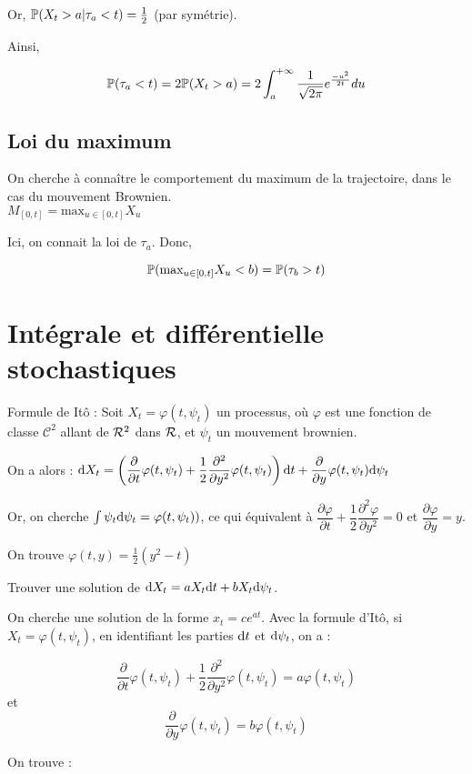 Or, $\P(X_t > a \vert \tau_a < t) = \frac{1}{2}$ (par symétrie).

Ainsi,

\[ \P(\tau_a < t) = 2\P(X_t > a) = 2 \int_a^{+\infty} \frac{1}{\sqrt{2\pi}} e^{\frac{-u^2}{2t}} du \]

\subsection{Loi du maximum}

On cherche à connaître le comportement du maximum de la trajectoire, dans le cas du mouvement Brownien. \\
$M_{[0,t]} = \text{max}_{u \in [0,t]} X_u$

Ici, on connait la loi de $\tau_a$. Donc,

\[ \P(\text{max}_{u \in [0,t]} X_u < b) = \P(\tau_b > t) \]

\section{Intégrale et différentielle stochastiques}

Formule de Itô : Soit $X_t = \varphi(t,\psi_t)$ un processus, où $\varphi$ est une fonction de classe $\mathcal{C}^2$ allant de $\R^2$ dans $\R$, et $\psi_t$ un mouvement brownien.

On a alors :
$\ud X_t = \left(\dfrac{\partial }{\partial t}\varphi(t,\psi_t) + \dfrac{1}{2}\dfrac{\partial^2}{\partial y^2}\varphi(t,\psi_t)\right) \ud t + \dfrac{\partial}{\partial y}\varphi(t,\psi_t) \ud \psi_t $

Or, on cherche $\int \psi_t \ud \psi_t = \varphi(t,\psi_t))$, ce qui équivalent à $\dfrac{\partial \varphi}{\partial t} + \dfrac{1}{2}\dfrac{\partial^2 \varphi}{\partial y^2} = 0$ et $\dfrac{\partial \varphi}{\partial y} = y$.

On trouve $\varphi(t,y) = \frac{1}{2}(y^2-t)$

Trouver une solution de $\ud X_t = aX_t \ud t + b X_t \ud \psi_t$.

On cherche une solution de la forme $x_t = ce^{at}$. Avec la formule d'Itô, si $X_t = \varphi(t,\psi_t)$, en identifiant les parties $\ud t$ et $\ud \psi_t$, on a :

\[ \dfrac{\partial }{\partial t}\varphi(t,\psi_t) + \dfrac{1}{2}\dfrac{\partial^2}{\partial y^2}\varphi(t,\psi_t) = a\varphi(t,\psi_t) \]
et 
\[\dfrac{\partial}{\partial y}\varphi(t,\psi_t) = b\varphi(t,\psi_t) \]

On trouve :

